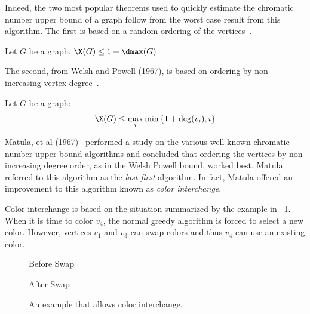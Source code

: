 Indeed, the two most popular theorems used to quickly estimate the chromatic number upper bound of a graph follow
from the worst case result from this algorithm.  The first is based on a random ordering of the
vertices~\cite{chartrand}.

\begin{theorem}
  \label{thm:upper}
  Let \(G\) be a graph.  \(\X(G)\le1+\dmax(G)\)
\end{theorem}

The second, from Welsh and Powell (1967), is based on ordering by non-increasing vertex degree~\cite{welsh}.

\begin{theorem}
  \label{thm:welsh}
  Let \(G\) be a graph:
  \[\X(G)\le\max_i\min\left\{1+\deg(v_i),i\right\}\]
\end{theorem}

Matula, et al (1967)~\cite{matula} performed a study on the various well-known chromatic number upper bound
algorithms and concluded that ordering the vertices by non-increasing degree order, as in the Welsh Powell bound,
worked best.  Matula referred to this algorithm as the \emph{last-first} algorithm.  In fact, Matula offered an
improvement to this algorithm known as \emph{color interchange}.

Color interchange is based on the situation summarized by the example in \figurename~\ref{fig:interchange}.  When it
is time to color \(v_4\), the normal greedy algorithm is forced to select a new color.  However, vertices \(v_1\)
and \(v_3\) can swap colors and thus \(v_4\) can use an existing color.

\begin{figure}[H]
  \begin{minipage}{2.5in}
    \centering

    Before Swap
  \end{minipage}
  \begin{minipage}{2.5in}
    \centering

    After Swap
  \end{minipage}
  \caption{An example that allows color interchange.}
  \label{fig:interchange}
\end{figure}


